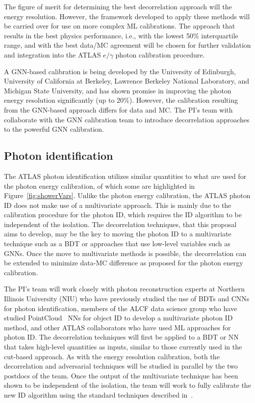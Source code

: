 \documentclass[letter, USenglish, 11pt, subfigure]{article}
\begin{document}

The figure of merit for determining the best decorrelation approach will the energy resolution. However, the framework developed to apply these methods will be carried over for use on more complex ML calibrations. The approach that results in the best physics performance, i.e., with the lowest 50\% interquartile range, and with the best data/MC agreement will be chosen for further validation and integration into the ATLAS $e/\gamma$ photon calibration procedure.


A GNN-based calibration is being developed by the University of Edinburgh, University of California at Berkeley, Lawrence Berkeley National Laboratory, and Michigan State University, and has shown promise in improving the photon energy resolution significantly (up to 20\%). However, the calibration resulting from the GNN-based approach differs for data and MC. The PI's team with collaborate with the GNN calibration team to introduce decorrelation approaches to the powerful GNN calibration.

\subsection{Photon identification}

The ATLAS photon identification utilizes similar quantities to what are used for the photon energy calibration, of which some are highlighted in Figure~\ref{fig:showerVars}. Unlike the photon energy calibration, the ATLAS photon ID does not make use of a multivariate approach. This is mainly due to the calibration procedure for the photon ID, which requires the ID algorithm to be independent of the isolation. The decorrelation techniques, that this proposal aims to develop, may be the key to moving the photon ID to a multivariate technique such as a BDT or approaches that use low-level variables such as GNNs. Once the move to multivariate methods is possible, the decorrelation can be extended to minimize data-MC difference as proposed for the photon energy calibration.

The PI's team will work closely with photon reconstruction experts at Northern Illinois University (NIU) who have previously studied the use of BDTs and CNNs for photon identification, members of the ALCF data science group who have studied PointCloud~\cite{ATL-PHYS-PUB-2021-002} NNs for object ID to develop a multivariate photon ID method, and other ATLAS collaborators who have used ML approaches for photon ID. The decorrelation techniques will first be applied to a BDT or NN that takes high-level quantities as inputs, similar to those currently used in the cut-based approach. As with the energy resolution calibration, both the decorrelation and adversarial techniques will be studied in parallel by the two postdocs of the team. Once the output of the multivariate technique has been shown to be independent of the isolation, the team will work to fully calibrate the new ID algorithm using the standard techniques described in~\cite{PERF-2013-04,PERF-2017-02}.
\end{document}

